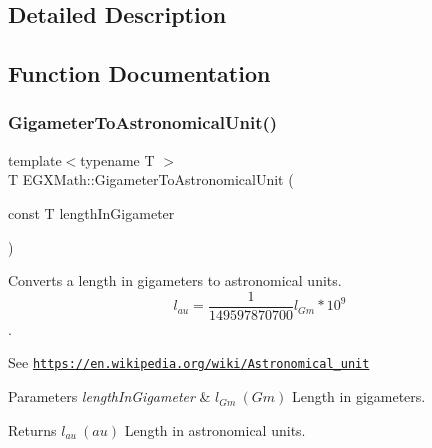 \subsection{Detailed Description}


\subsection{Function Documentation}
\mbox{\label{group___e_g_x_math-_conversions-_length_conversions-_s_i-_gigameter-_astronomical_ga048b5af6ec2f33e28435823ffa238d17}} 
\subsubsection{\texorpdfstring{Gigameter\+To\+Astronomical\+Unit()}{GigameterToAstronomicalUnit()}}
{\footnotesize\ttfamily template$<$typename T $>$ \\
T E\+G\+X\+Math\+::\+Gigameter\+To\+Astronomical\+Unit (\begin{DoxyParamCaption}\item[{const T}]{length\+In\+Gigameter }\end{DoxyParamCaption})}



Converts a length in gigameters to astronomical units. \[ l_{au}= \frac{1}{149597870700} l_{Gm} * 10^{9} \]. 

See \href{https://en.wikipedia.org/wiki/Astronomical_unit}{\tt https\+://en.\+wikipedia.\+org/wiki/\+Astronomical\+\_\+unit} 
\begin{DoxyParams}{Parameters}
{\em length\+In\+Gigameter} & $ l_{Gm}\ (Gm)$ Length in gigameters. \\
\hline
\end{DoxyParams}
\begin{DoxyReturn}{Returns}
$ l_{au}\ (au)$ Length in astronomical units. 
\end{DoxyReturn}
\mbox{\label{group___e_g_x_math-_conversions-_length_conversions-_s_i-_gigameter-_astronomical_ga352bdc453f4bccc2dd188f009c02ff62}} 

